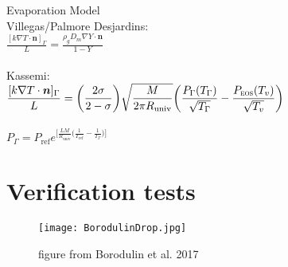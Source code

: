 \documentclass[]{article}
\begin{document}
\noindent
Evaporation Model\\
\hspace*{20pt}  Villegas/Palmore Desjardins:\\
\hspace*{20pt} $\displaystyle \frac{[k\nabla T\cdot \bm{n}]_\Gamma}{L}= \frac{\rho_g D_m \nabla Y \cdot \bm{n}}{1-Y} $\\\\

\noindent
\hspace*{20pt} Kassemi:\\
\hspace*{20pt} $\displaystyle \frac{[k\nabla T\cdot \bm{n}]_\Gamma}{L} = \bigg(\frac{2\sigma}{2-\sigma}\bigg)\sqrt{\frac{M}{2\pi R_{\textrm{univ}}} }\bigg(\frac{P_\Gamma(T_\Gamma)}{\sqrt{T_\Gamma}} - \frac{P_{\textsc{eos}}(T_v)}{\sqrt{T_v}}\bigg)$\\\\
\hspace*{20pt} $P_\Gamma=P_{\textrm{ref}}e^{\big[\frac{LM}{R_{\textrm{univ}}}\big(\frac{1}{T_{\textrm{ref}}} - \frac{1}{T_\Gamma}\big) \big]}$

\section*{Verification tests} 
\begin{figure}[h]
\centering
\texttt{[image: BorodulinDrop.jpg]}
\caption{figure from Borodulin et al. 2017 \cite{BORODULIN2017}
  \label{experiment} }
\end{figure}
\FloatBarrier
\end{document}
